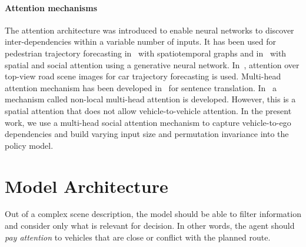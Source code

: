 \documentclass{article}
\begin{document}
{\paragraph{Attention mechanisms} {The attention architecture was introduced to enable neural networks to discover inter-dependencies within a variable number of inputs.
It has been used for pedestrian trajectory forecasting in~\cite{Vemula2018} with spatiotemporal graphs and in~\cite{Sadeghian2019CVPR} with spatial and social attention using a generative neural network. In~\cite{Sadeghian2018ECCV}, attention over top-view road scene images for car trajectory forecasting is used. Multi-head attention mechanism has been developed in~\cite{Vaswani2017} for sentence translation. In~\cite{Messaoud2019} a mechanism called non-local multi-head attention is developed. However, this is a spatial attention that does not allow vehicle-to-vehicle attention. In the present work, we use a multi-head social attention mechanism to capture vehicle-to-ego dependencies and build varying input size and permutation invariance into the policy model.}

\section{Model Architecture}

Out of a complex scene description, the model should be able to filter information and consider only what is relevant for decision. In other words, the agent should \emph{pay attention} to vehicles that are close or conflict with the planned route. 

}
\end{document}
